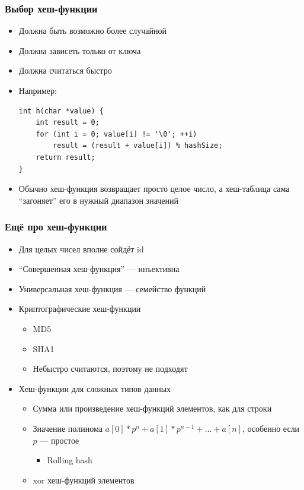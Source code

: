 \documentclass[xetex,mathserif,serif]{beamer}
\begin{document}
	\begin{frame}[fragile]
		\frametitle{Выбор хеш-функции}
		\begin{itemize}
			\item Должна быть возможно более случайной
			\item Должна зависеть только от ключа
			\item Должна считаться быстро
			\item Например:
				\begin{verbatim}
int h(char *value) {
    int result = 0;
    for (int i = 0; value[i] != '\0'; ++i)
        result = (result + value[i]) % hashSize;
    return result;
}
				\end{verbatim}
			\item Обычно хеш-функция возвращает просто целое число, а хеш-таблица сама ``загоняет'' его в нужный диапазон значений
		\end{itemize}
	\end{frame}

	\begin{frame}
		\frametitle{Ещё про хеш-функции}
		\begin{itemize}
			\item Для целых чисел вполне сойдёт id
			\item ``Совершенная хеш-функция'' --- инъективна
			\item Универсальная хеш-функция --- семейство функций
			\item Криптографические хеш-функции
				\begin{itemize}
					\item MD5
					\item SHA1
					\item Небыстро считаются, поэтому не подходят
				\end{itemize}
			\item Хеш-функции для сложных типов данных
				\begin{itemize}
					\item Сумма или произведение хеш-функций элементов, как для строки
					\item Значение полинома $a[0]*p^n + a[1]*p^{n - 1} + … + a[n]$, особенно если $p$ --- простое
					\begin{itemize}
						\item Rolling hash
					\end{itemize}
					\item xor хеш-функций элементов
				\end{itemize}
		\end{itemize}
	\end{frame}
\end{document}

